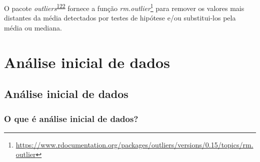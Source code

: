 \documentclass[
  a4paper,
]{book}
\renewcommand{\href}[2]{#2\footnote{\url{#1}}}
\newenvironment{infobox}[1]
  {
  \begin{itemize}
  \renewcommand{\labelitemi}{
    \raisebox{-.7\height}[0pt][0pt]{
      {\setkeys{Gin}{width=3em,keepaspectratio}
        \texttt{[image: \#1]}}
    }
  }
  \setlength{\fboxsep}{1em}
  \begin{blackbox}
  \item
  }
  {
  \end{blackbox}
  \end{itemize}
  }
\begin{document}
\begin{infobox}{images/Rlogo}
O pacote \emph{outliers}\textsuperscript{\protect\hyperlink{ref-outliers}{122}} fornece a função \href{https://www.rdocumentation.org/packages/outliers/versions/0.15/topics/rm.outlier}{\emph{rm.outlier}} para remover os valores mais distantes da média detectados por testes de hipótese e/ou substitui-los pela média ou mediana.

\end{infobox}

\hypertarget{analise-inicial-dados}{%
\chapter{\texorpdfstring{\textbf{Análise inicial de dados}}{Análise inicial de dados}}\label{analise-inicial-dados}}

\hypertarget{analise-inicial}{%
\section{Análise inicial de dados}\label{analise-inicial}}

\hypertarget{o-que-uxe9-anuxe1lise-inicial-de-dados}{%
\subsection{O que é análise inicial de dados?}\label{o-que-uxe9-anuxe1lise-inicial-de-dados}}
\end{document}
